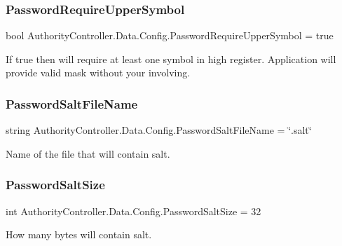 \subsubsection{\texorpdfstring{Password\+Require\+Upper\+Symbol}{PasswordRequireUpperSymbol}}
{\footnotesize\ttfamily bool Authority\+Controller.\+Data.\+Config.\+Password\+Require\+Upper\+Symbol = true}



If true then will require at least one symbol in high register. Application will provide valid mask without your involving. 

\mbox{\label{class_authority_controller_1_1_data_1_1_config_a7f2f02b43ede6e98bbe1712f0a5689e2}} 
\subsubsection{\texorpdfstring{Password\+Salt\+File\+Name}{PasswordSaltFileName}}
{\footnotesize\ttfamily string Authority\+Controller.\+Data.\+Config.\+Password\+Salt\+File\+Name = \char`\"{}.salt\char`\"{}}



Name of the file that will contain salt. 

\mbox{\label{class_authority_controller_1_1_data_1_1_config_a01c8efd020aa29a69dcc145cd9dd8c1f}} 
\subsubsection{\texorpdfstring{Password\+Salt\+Size}{PasswordSaltSize}}
{\footnotesize\ttfamily int Authority\+Controller.\+Data.\+Config.\+Password\+Salt\+Size = 32}



How many bytes will contain salt. 

